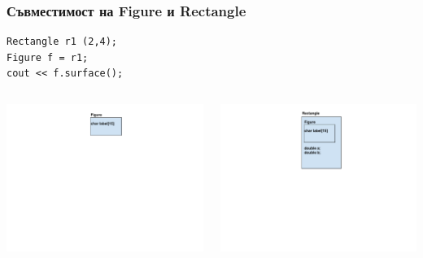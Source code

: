\documentclass{beamer}
\begin{document}
\begin{frame}[fragile]
\frametitle{Съвместимост на Figure и Rectangle}


\begin{flushleft}
\begin{lstlisting}
Rectangle r1 (2,4);
Figure f = r1;
cout << f.surface();
\end{lstlisting}  
\end{flushleft}



\begin{columns}[t]
  \hspace{-150px}
  \begin{column}{0.5\textwidth}
\begin{center}
\includegraphics[width=12.0cm]{images/inmem_figure}
\end{center}

  \end{column}
  \begin{column}{0.5\textwidth}
\begin{center}
  \hspace{-150px}
\includegraphics[width=12.0cm]{images/inmem_rectangle}
\end{center}


\end{column}
\end{columns}
\end{frame}
\end{document}
